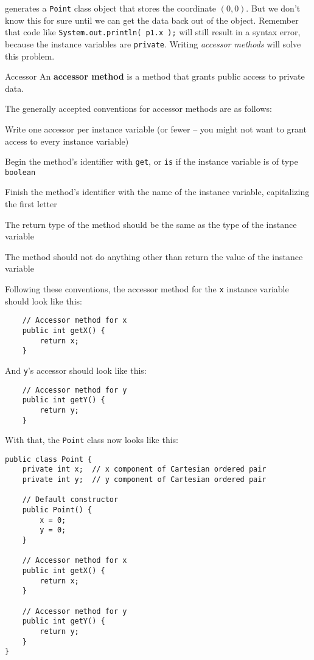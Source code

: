 generates a \texttt{Point} class object that stores the coordinate $(0,0)$.  But we don't know this for sure until we can get the data back out of the object.  Remember that code like \texttt{System.out.println( p1.x );} will still result in a syntax error, because the instance variables are \texttt{private}.  Writing \textit{accessor methods} will solve this problem.

\begin{defn}{Accessor}
    An \textbf{accessor method} is a method that grants public access to private data.
\end{defn}

The generally accepted conventions for accessor methods are as follows:
\bi
\item Write one accessor per instance variable (or fewer -- you might not want to grant access to every instance variable)
\item Begin the method's identifier with \texttt{get}, or \texttt{is} if the instance variable is of type \texttt{boolean}
\item Finish the method's identifier with the name of the instance variable, capitalizing the first letter
\item The return type of the method should be the same as the type of the instance variable
\item The method should not do anything other than return the value of the instance variable
\ei

Following these conventions, the accessor method for the \texttt{x} instance variable should look like this:

\begin{verbatim}
    // Accessor method for x
    public int getX() {
        return x;
    }
\end{verbatim}

And \texttt{y}'s accessor should look like this:

\begin{verbatim}
    // Accessor method for y
    public int getY() {
        return y;
    }
\end{verbatim}

With that, the \texttt{Point} class now looks like this:

\begin{verbatim}
public class Point {
    private int x;  // x component of Cartesian ordered pair
    private int y;  // y component of Cartesian ordered pair

    // Default constructor
    public Point() {
        x = 0;
        y = 0;
    }

    // Accessor method for x
    public int getX() {
        return x;
    }

    // Accessor method for y
    public int getY() {
        return y;
    }
}
\end{verbatim}

